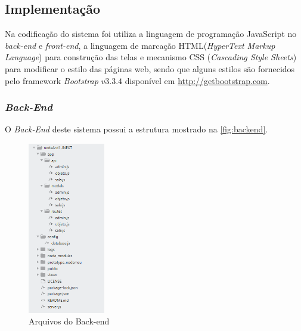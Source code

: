 

\subsection{Implementação}

Na codificação do sistema foi utiliza a linguagem de programação JavaScript no \textit{back-end} e \textit{front-end}, a linguagem de marcação HTML(\textit{HyperText Markup Language}) para construção das telas e mecanismo CSS (\textit{Cascading Style Sheets}) para modificar o estilo das páginas web, sendo que alguns estilos são fornecidos pelo framework \textit{Bootstrap} $v3.3.4$ disponível em \url{http://getbootstrap.com}.

\subsubsection{\textit{Back-End}}

O \textit{Back-End} deste sistema possui a estrutura mostrado na \autoref{fig:backend}.
\begin{figure}[H]
	  \caption{\label{fig:backend}Arquivos do Back-end}
	  \centering
	  \includegraphics[width=0.3\textwidth]{Figuras/back_end.PNG}
\end{figure}
    
